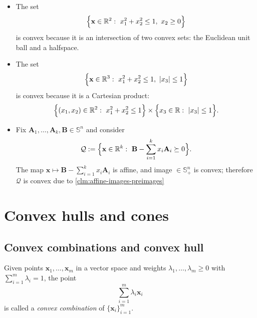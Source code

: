 \begin{example}
\leavevmode
\begin{itemize}
  \item The set
  \[
    \Bigl\{\mathbf{x}\in\mathbb{R}^2:\ x_1^2+x_2^2\le 1,\ x_2\ge 0\Bigr\}
  \]
  is convex because it is an intersection of two convex sets: the Euclidean unit ball and a halfspace.
  \item The set
  \[
    \Bigl\{\mathbf{x}\in\mathbb{R}^3:\ x_1^2+x_2^2\le 1,\ |x_3|\le 1\Bigr\}
  \]
  is convex because it is a Cartesian product:
  \[
    \Bigl\{(x_1,x_2)\in\mathbb{R}^2:\ x_1^2+x_2^2\le 1\Bigr\}\times \Bigl\{x_3\in\mathbb{R}:\ |x_3|\le 1\Bigr\}.
  \]
  \item Fix $\mathbf{A}_1,\ldots,\mathbf{A}_k,\mathbf{B}\in\mathbb{S}^n$ and consider
  \[
    \mathcal{Q}:=\Bigl\{\mathbf{x}\in\mathbb{R}^k:\ \mathbf{B}-\sum_{i=1}^k x_i \mathbf{A}_i \succeq 0\Bigr\}.
  \]
  The map $\mathbf{x}\mapsto \mathbf{B}-\sum_{i=1}^k x_i\mathbf{A}_i$ is affine, and image $\in \mathbb{S}^n_+$ 
  is convex;
  therefore $\mathcal{Q}$ is convex due to \cref{clm:affine-images-preimages}
\end{itemize}
\end{example}

\section{Convex hulls and cones}
\label{sec:ch4-convex-hull-cones}
\subsection{Convex combinations and convex hull}
\begin{definition}
Given points $\mathbf{x}_1,\ldots,\mathbf{x}_m$ in a vector space and weights
$\lambda_1,\ldots,\lambda_m\ge 0$ with $\sum_{i=1}^m \lambda_i=1$, the point
\[
  \sum_{i=1}^m \lambda_i \mathbf{x}_i
\]
is called a \emph{convex combination} of $\{\mathbf{x}_i\}_{i=1}^m$.
\end{definition}

